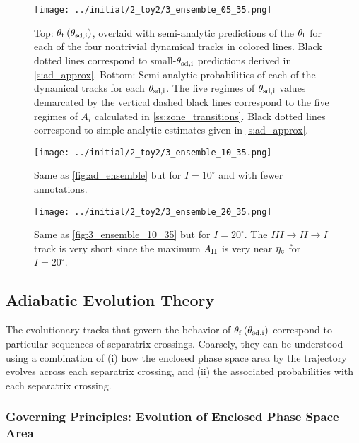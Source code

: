 \documentclass[
        fleqn,
        usenatbib,
        referee,
    ]{mnras}
\newcommand*{\p}[1]{\left(#1\right)}
\begin{document}
\begin{figure}
    \centering
    \texttt{[image: ../initial/2\_toy2/3\_ensemble\_05\_35.png]}
    \caption{Top: $\theta_{\rm f}\p{\theta_{\rm sd, i}}$, overlaid with
    semi-analytic predictions of the $\theta_{\rm  f}$ for each of the four
    nontrivial dynamical tracks in colored lines. Black dotted lines correspond
    to small-$\theta_{\rm sd, i}$ predictions derived in \autoref{s:ad_approx}.
    Bottom: Semi-analytic probabilities of each of the dynamical tracks for each
    $\theta_{\rm sd, i}$. The five regimes of $\theta_{\rm sd, i}$ values
    demarcated by the vertical dashed black lines correspond to the five regimes
    of $A_i$ calculated in \autoref{ss:zone_transitions}. Black dotted lines
    correspond to simple analytic estimates given in
    \autoref{s:ad_approx}.}\label{fig:ad_ensemble}
\end{figure}
\begin{figure}
    \centering
    \texttt{[image: ../initial/2\_toy2/3\_ensemble\_10\_35.png]}
    \caption{Same as \autoref{fig:ad_ensemble} but for $I =
    10^\circ$ and with fewer annotations.}\label{fig:3_ensemble_10_35}
\end{figure}
\begin{figure}
    \centering
    \texttt{[image: ../initial/2\_toy2/3\_ensemble\_20\_35.png]}
    \caption{Same as \autoref{fig:3_ensemble_10_35} but for $I = 20^\circ$. The
    $III \to II \to I$ track is very short since the maximum $A_{\rm II}$ is very
    near $\eta_{\rm c}$ for $I = 20^\circ$.}\label{fig:3_ensemble_20_35}
\end{figure}

\subsection{Adiabatic Evolution Theory}\label{ss:zone_transitions}

The evolutionary tracks that govern the behavior of $\theta_{\rm
f}\p{\theta_{\rm sd, i}}$ correspond to particular sequences of separatrix
crossings. Coarsely, they can be understood using a combination of (i) how the
enclosed phase space area by the trajectory evolves across each separatrix
crossing, and (ii) the associated probabilities with each separatrix crossing.

\subsubsection{Governing Principles: Evolution of Enclosed Phase Space
Area}\label{sss:a_evo}
\end{document}
